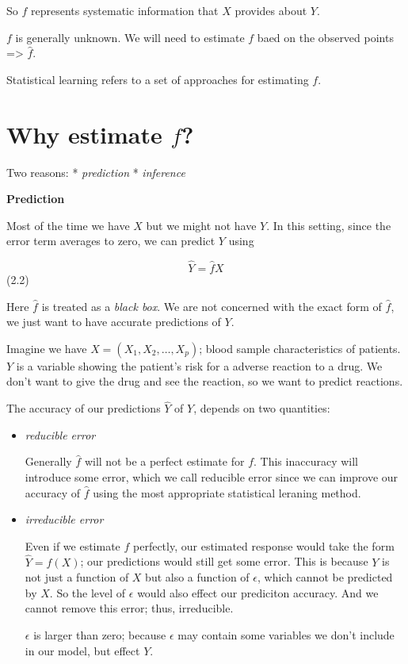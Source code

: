 \documentclass[
  letterpaper,
  DIV=11,
  numbers=noendperiod]{scrreprt}
\begin{document}
So \(f\) represents systematic information that \(X\) provides about
\(Y\).

\(f\) is generally unknown. We will need to estimate \(f\) baed on the
observed points =\textgreater{} \(\hat{f}\).

Statistical learning refers to a set of approaches for estimating \(f\).

\hypertarget{why-estimate-f}{%
\section{\texorpdfstring{Why estimate
\(f\)?}{Why estimate f?}}\label{why-estimate-f}}

Two reasons: * \emph{prediction} * \emph{inference}

\textbf{Prediction}

Most of the time we have \(X\) but we might not have \(Y\). In this
setting, since the error term averages to zero, we can predict \(Y\)
using

\[
\hat{Y} = \hat{f}X
\] (2.2)

Here \(\hat{f}\) is treated as a \emph{black box}. We are not concerned
with the exact form of \(\hat{f}\), we just want to have accurate
predictions of \(Y\).

Imagine we have \(X = (X_1, X_2, \dots, X_p)\); blood sample
characteristics of patients. \(Y\) is a variable showing the patient's
risk for a adverse reaction to a drug. We don't want to give the drug
and see the reaction, so we want to predict reactions.

The accuracy of our predictions \(\hat{Y}\) of \(Y\), depends on two
quantities:

\begin{itemize}
\item
  \emph{reducible error}

  Generally \(\hat{f}\) will not be a perfect estimate for \(f\). This
  inaccuracy will introduce some error, which we call reducible error
  since we can improve our accuracy of \(\hat{f}\) using the most
  appropriate statistical leraning method.
\item
  \emph{irreducible error}

  Even if we estimate \(f\) perfectly, our estimated response would take
  the form \(\hat{Y} = f(X)\); our predictions would still get some
  error. This is because \(Y\) is not just a function of \(X\) but also
  a function of \(\epsilon\), which cannot be predicted by \(X\). So the
  level of \(\epsilon\) would also effect our prediciton accuracy. And
  we cannot remove this error; thus, irreducible.

  \(\epsilon\) is larger than zero; because \(\epsilon\) may contain
  some variables we don't include in our model, but effect \(Y\).
\end{itemize}
\end{document}

